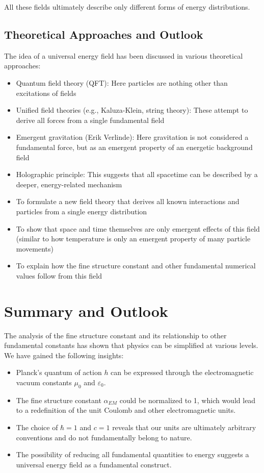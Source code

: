 \documentclass[12pt,a4paper]{article}
\begin{document}
	All these fields ultimately describe only different forms of energy distributions.
	
	\subsection{Theoretical Approaches and Outlook}
	
	The idea of a universal energy field has been discussed in various theoretical approaches:
	
	\begin{itemize}
		\item Quantum field theory (QFT): Here particles are nothing other than excitations of fields
		\item Unified field theories (e.g., Kaluza-Klein, string theory): These attempt to derive all forces from a single fundamental field
		\item Emergent gravitation (Erik Verlinde): Here gravitation is not considered a fundamental force, but as an emergent property of an energetic background field
		\item Holographic principle: This suggests that all spacetime can be described by a deeper, energy-related mechanism
	\end{itemize}
	
	\begin{itemize}
		\item To formulate a new field theory that derives all known interactions and particles from a single energy distribution
		\item To show that space and time themselves are only emergent effects of this field (similar to how temperature is only an emergent property of many particle movements)
		\item To explain how the fine structure constant and other fundamental numerical values follow from this field
	\end{itemize}
	
	\section{Summary and Outlook}
	
	The analysis of the fine structure constant and its relationship to other fundamental constants has shown that physics can be simplified at various levels. We have gained the following insights:
	
	\begin{itemize}
		\item Planck's quantum of action $h$ can be expressed through the electromagnetic vacuum constants $\mu_0$ and $\varepsilon_0$.
		\item The fine structure constant $\alpha_{EM}$ could be normalized to 1, which would lead to a redefinition of the unit Coulomb and other electromagnetic units.
		\item The choice of $\hbar = 1$ and $c = 1$ reveals that our units are ultimately arbitrary conventions and do not fundamentally belong to nature.
		\item The possibility of reducing all fundamental quantities to energy suggests a universal energy field as a fundamental construct.
	\end{itemize}
	
\end{document}
